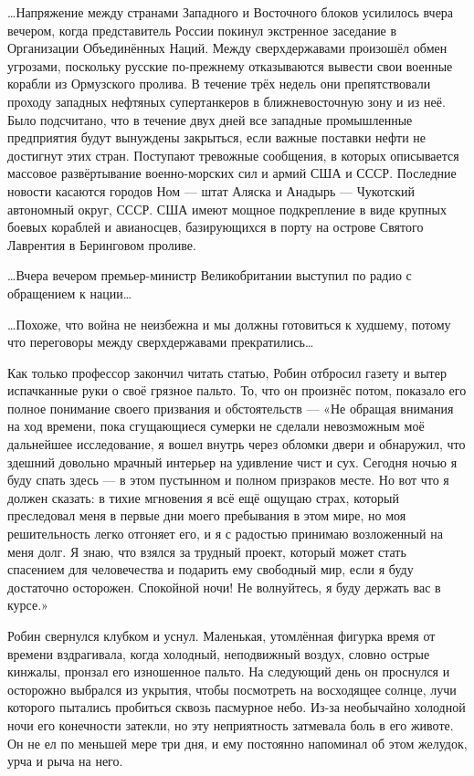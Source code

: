 \documentclass[a4paper,12pt]{book}
\begin{document}
	…Напряжение между странами Западного и Восточного блоков усилилось вчера вечером, когда представитель России покинул экстренное заседание в Организации Объединённых Наций.
	Между сверхдержавами произошёл обмен угрозами, поскольку русские по-прежнему отказываются вывести свои военные корабли из Ормузского пролива. В течение трёх недель они препятствовали проходу западных нефтяных супертанкеров в ближневосточную зону и из неё. Было подсчитано, что в течение двух дней все западные промышленные предприятия будут вынуждены закрыться, если важные поставки нефти не достигнут этих стран.
	Поступают тревожные сообщения, в которых описывается массовое развёртывание военно-морских сил и армий США и СССР. Последние новости касаются городов Ном — штат Аляска и Анадырь — Чукотский автономный округ, СССР. США имеют мощное подкрепление в виде крупных боевых кораблей и авианосцев, базирующихся в порту на острове Святого Лаврентия в Беринговом проливе.

	…Вчера вечером премьер-министр Великобритании выступил по радио с обращением к нации… 

	…Похоже, что война не неизбежна и мы должны готовиться к худшему, потому что переговоры между сверхдержавами прекратились…

	Как только профессор закончил читать статью, Робин отбросил газету и вытер испачканные руки о своё грязное пальто. То, что он произнёс потом, показало его полное понимание своего призвания и обстоятельств —
	«Не обращая внимания на ход времени, пока сгущающиеся сумерки не сделали невозможным моё дальнейшее исследование, я вошел внутрь через обломки двери и обнаружил, что здешний довольно мрачный интерьер на удивление чист и сух. Сегодня ночью я буду спать здесь — в этом пустынном и полном призраков месте. Но вот что я должен сказать: в тихие мгновения я всё ещё ощущаю страх, который преследовал меня в первые дни моего пребывания в этом мире, но моя решительность легко отгоняет его, и я с радостью принимаю возложенный на меня долг. Я знаю, что взялся за трудный проект, который может стать спасением для человечества и подарить ему свободный мир, если я буду достаточно осторожен. Спокойной ночи! Не волнуйтесь, я буду держать вас в курсе.»

	Робин свернулся клубком и уснул. Маленькая, утомлённая фигурка время от времени вздрагивала, когда холодный, неподвижный воздух, словно острые кинжалы, пронзал его изношенное пальто. На следующий день он проснулся и осторожно выбрался из укрытия, чтобы посмотреть на восходящее солнце, лучи которого пытались пробиться сквозь пасмурное небо. Из-за необычайно холодной ночи его конечности затекли, но эту неприятность затмевала боль в его животе. Он не ел по меньшей мере три дня, и ему постоянно напоминал об этом желудок, урча и рыча на него.
\end{document}
